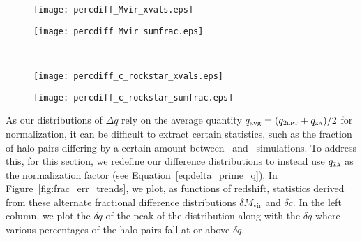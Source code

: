 \begin{figure*}[t]
	\centering
	\begin{subfigure}{}
		\texttt{[image: percdiff\_Mvir\_xvals.eps]}
	\end{subfigure}
	\begin{subfigure}{}
		\texttt{[image: percdiff\_Mvir\_sumfrac.eps]}
	\end{subfigure}
	\\
	\begin{subfigure}{}
		\texttt{[image: percdiff\_c\_rockstar\_xvals.eps]}
	\end{subfigure}
	\begin{subfigure}{}
		\texttt{[image: percdiff\_c\_rockstar\_sumfrac.eps]}
	\end{subfigure}
	\caption[Statistics for distributions of $\delta q$ as functions of redshift]{\footnotesize Statistics for distributions of $\delta M_{\mathrm{vir}}$ (\textit{top row}) and $\delta c$ (\textit{bottom row}) as functions of redshift.  \textit{Left column}:  The $\delta q$ of the peak of the distribution (black curve), and the $\delta q$ where 50\% (red dashed curve), 10\% (green dashed curve), and 1\% (blue dashed curve) of the halos fall at or above $\delta q$.  As with distributions of $\Delta M_{\mathrm{vir}}$, $\delta M_{\mathrm{vir}}$ has the largest positive displacement at high redshift and steadily decreases throughout the simulation.  Additionally, $\delta c$ maintains a peak near zero and has a spread much larger than that of $\delta M_{\mathrm{vir}}$.  \textit{Right column}:  The fraction of halos with $\delta q$ greater than 0.10 (solid blue curve), 0.50 (solid green curve), 1.00 (solid red curve), and 4.00 (solid black curve).  The dashed curves additionally count halo pairs with $\delta q$ lower than the corresponding equivalent displacements of -0.09, -0.33, -0.50, and -0.80, respectively (see Equation~\ref{eq:equivalent_q_prime}).  We find that 50\% of \lpt\ halos are at least 10\% more massive than their \za\ companions at $z = 15$, reducing to 10\% by $z = 6$.  Halos in \lpt\ are at least twice as concentrated for 12\% of halos at $z = 15$ and 7.8\% of halos at $z = 6$.}
	\label{fig:frac_err_trends}
\end{figure*}

As our distributions of $\Delta q$ rely on the average quantity $q_{\mathrm{avg}} = (q_{\textsc{2lpt}} + q_{\textsc{za}}) / 2$ for normalization, it can be difficult to extract certain statistics, such as the fraction of halo pairs differing by a certain amount between \lpt\ and \za\ simulations.  To address this, for this section, we redefine our difference distributions to instead use $q_{\textsc{za}}$ as the normalization factor (see Equation~\ref{eq:delta_prime_q}).  In Figure~\ref{fig:frac_err_trends}, we plot, as functions of redshift, statistics derived from these alternate fractional difference distributions $\delta M_{\mathrm{vir}}$ and $\delta c$.  In the left column, we plot the $\delta q$ of the peak of the distribution along with the $\delta q$ where various percentages of the halo pairs fall at or above $\delta q$.

